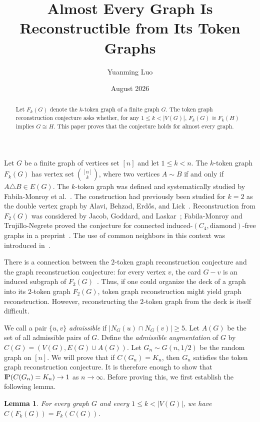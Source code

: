 \documentclass[11pt]{amsart}
\title{Almost Every Graph Is Reconstructible from Its Token Graphs}
\author{Yuanming Luo}
\date{August 2026}
\newcommand{\probP}{\text{I\kern-0.15em P}}
\newtheorem{lemma}[theorem]{Lemma}
\begin{document}
\begin{abstract}
Let $F_k(G)$ denote the $k$-token graph of a finite graph $G$. The token graph reconstruction conjecture asks whether, for any $1\le k<|V(G)|$, $F_k(G)\cong F_k(H)$ implies $G\cong H$. This paper proves that the conjecture holds for almost every graph.
\end{abstract}

\maketitle


Let $G$ be a finite graph of vertices set $[n]$ and let $1 \leq k < n$. The $k$-token graph $F_k(G)$ has vertex set $\binom{[n]}{k}$, where two vertices $A \sim B$ if and only if $A \triangle B \in E(G)$. The $k$-token graph was defined and systematically studied by Fabila-Monroy et al.~\cite{FabilaMonroyEtAl2012}. The construction had previously been studied for $k=2$ as the double vertex graph by Alavi, Behzad, Erd\H{o}s, and Lick~\cite{AlaviBehzadErdosLick1991}. Reconstruction from $F_2(G)$ was considered by Jacob, Goddard, and Laskar~\cite{JacobGoddardLaskar2007}; Fabila-Monroy and Trujillo-Negrete proved the conjecture for connected induced-$(C_4,\mathrm{diamond})$-free graphs in a preprint~\cite{FabilaMonroyTrujilloNegrete2022}. The use of common neighbors in this context was introduced in~\cite{JacobGoddardLaskar2007}.

There is a connection between the $2$-token graph reconstruction conjecture and the graph reconstruction conjecture: for every vertex $v$, the card $G-v$ is an induced subgraph of $F_2(G)$~\cite{FabilaMonroyEtAl2012}. Thus, if one could organize the deck of a graph into its $2$-token graph $F_2(G)$, token graph reconstruction might yield graph reconstruction. However, reconstructing the $2$-token graph from the deck is itself difficult.

We call a pair $\{u,v\}$ \emph{admissible} if $|N_G(u) \cap N_G(v)| \geq 5$. Let $A(G)$ be the set of all admissible pairs of $G$. Define the \emph{admissible augmentation} of $G$ by $C(G)=(V(G),E(G)\cup A(G))$. Let $G_n\sim G(n,1/2)$ be the random graph on $[n]$. We will prove that if $C(G_n)=K_n$, then $G_n$ satisfies the token graph reconstruction conjecture. It is therefore enough to show that $\probP(C(G_n)=K_n)\to 1$ as $n\to\infty$. Before proving this, we first establish the following lemma.

\begin{lemma}\label{lem:commutation}
For every graph $G$ and every $1\leq k<|V(G)|$, we have $C(F_k(G))=F_k(C(G))$.
\end{lemma}
\end{document}

